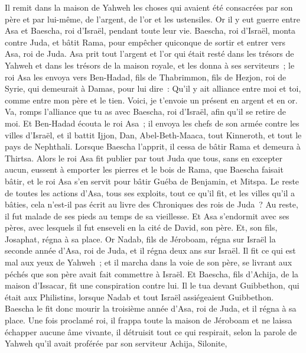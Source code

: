 \begin{multicols}{2}
Il remit dans la maison de Yahweh les choses qui avaient été consacrées par son père et par lui-même, de l'argent, de l'or et les ustensiles.
Or il y eut guerre entre Asa et Baescha, roi d'Israël, pendant toute leur vie.
Baescha, roi d'Israël, monta contre Juda, et bâtit Rama, pour empêcher quiconque de sortir et entrer vers Asa, roi de Juda.
Asa prit tout l'argent et l'or qui était resté dans les trésors de Yahweh et dans les trésors de la maison royale, et les donna à ses serviteurs~; le roi Asa les envoya vers Ben-Hadad, fils de Thabrimmon, fils de Hezjon, roi de Syrie, qui demeurait à Damas, pour lui dire~:
Qu'il y ait alliance entre moi et toi, comme entre mon père et le tien. Voici, je t'envoie un présent en argent et en or. Va, romps l'alliance que tu as avec Baescha, roi d'Israël, afin qu'il se retire de moi.
Et Ben-Hadad écouta le roi Asa~; il envoya les chefs de son armée contre les villes d'Israël, et il battit Ijjon, Dan, Abel-Beth-Maaca, tout Kinneroth, et tout le pays de Nephthali.
Lorsque Baescha l'apprit, il cessa de bâtir Rama et demeura à Thirtsa.
Alors le roi Asa fit publier par tout Juda que tous, sans en excepter aucun, eussent à emporter les pierres et le bois de Rama, que Baescha faisait bâtir, et le roi Asa s'en servit pour bâtir Guéba de Benjamin, et Mitspa.
Le reste de toutes les actions d'Asa, tous ses exploits, tout ce qu'il fit, et les villes qu'il a bâties, cela n'est-il pas écrit au livre des Chroniques des rois de Juda~? Au reste, il fut malade de ses pieds au temps de sa vieillesse.
Et Asa s'endormit avec ses pères, avec lesquels il fut enseveli en la cité de David, son père. Et, son fils, Josaphat, régna à sa place.
Or Nadab, fils de Jéroboam, régna sur Israël la seconde année d'Asa, roi de Juda, et il régna deux ans sur Israël.
Il fit ce qui est mal aux yeux de Yahweh~; et il marcha dans la voie de son père, se livrant aux péchés que son père avait fait commettre à Israël.
Et Baescha, fils d'Achija, de la maison d'Issacar, fit une conspiration contre lui. Il le tua devant Guibbethon, qui était aux Philistins, lorsque Nadab et tout Israël assiégeaient Guibbethon.
Baescha le fit donc mourir la troisième année d'Asa, roi de Juda, et il régna à sa place.
Une fois proclamé roi, il frappa toute la maison de Jéroboam et ne laissa échapper aucune âme vivante, il détruisit tout ce qui respirait, selon la parole de Yahweh qu'il avait proférée par son serviteur Achija, Silonite,

\end{multicols}
